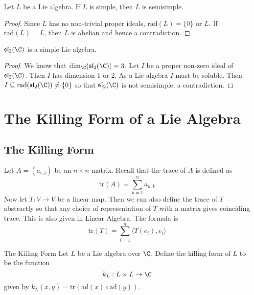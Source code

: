 \documentclass[a4paper]{article}
\begin{document}
\begin{lmm}{}{} Let $L$ be a Lie algebra. If $L$ is simple, then $L$ is semisimple. \tcbline
\begin{proof}
Since $L$ has no non-trivial proper ideals, $\text{rad}(L)=\{0\}$ or $L$. If $\text{rad}(L)=L$, then $L$ is abelian and hence a contradiction. 
\end{proof}
\end{lmm}

\begin{eg}{}{} $\mathfrak{sl}_2(\C)$ is a simple Lie algebra. \tcbline
\begin{proof}
We know that $\dim_\C(\mathfrak{sl}_2(\C))=3$. Let $I$ be a proper non-zero ideal of $\mathfrak{sl}_2(\C)$. Then $I$ has dimension $1$ or $2$. As a Lie algebra $I$ must be soluble. Then $I\subseteq\text{rad}(\mathfrak{sl}_2(\C))\neq\{0\}$ so that $\mathfrak{sl}_2(\C)$ is not semisimple, a contradiction. 
\end{proof}
\end{eg}

\pagebreak
\section{The Killing Form of a Lie Algebra}
\subsection{The Killing Form}
Let $A=(a_{i,j})$ be an $n\times n$ matrix. Recall that the trace of $A$ is defined as $$\text{tr}(A)=\sum_{k=1}^na_{k,k}$$ Now let $T:V\to V$ be a linear map. Then we can also define the trace of $T$ abstractly so that any choice of representation of $T$ with a matrix gives coinciding trace. This is also given in Linear Algebra. The formula is $$\text{tr}(T)=\sum_{i=1}^n\langle T(e_i),e_i\rangle$$

\begin{defn}{The Killing Form}{} Let $L$ be a Lie algebra over $\C$. Define the killing form of $L$ to be the function $$k_L:L\times L\to\C$$ given by $k_L(x,y)=\text{tr}(\text{ad}(x)\circ\text{ad}(y))$. 
\end{defn}
\end{document}
